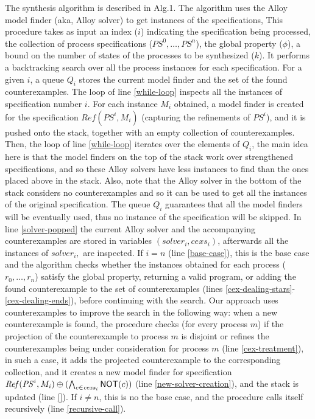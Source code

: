 	The synthesis algorithm is described in Alg.1. The algorithm uses the Alloy model finder (aka, Alloy solver) to get instances of the  specifications,  
This procedure takes as input an index ($i$) indicating the specification being processed, the collection of process specifications ($\textit{PS}^0,\dots,\textit{PS}^n$), the global property  ($\phi$), a bound on the number of states of the processes to be synthesized ($k$). It performs a backtracking search over all the process instances for each specification. For a given $i$, a queue $Q_i$ stores the current model finder and the set of the found counterexamples. The loop of line \ref{while-loop} inspects all the instances of specification number $i$. For each instance $M_i$ obtained, a model finder is created for the specification $\textit{Ref}(\textit{PS}^i, M_i)$ (capturing the refinements of $\textit{PS}^i$), and it is pushed onto the stack, together with an empty collection of
counterexamples. Then, the loop of line \ref{while-loop} iterates over the elements of $Q_i$, the main idea here is that the model finders on the top of the stack work over strengthened specifications, and so these Alloy solvers have less instances to find than the ones placed  above in the stack.  Also, note that the Alloy solver in the bottom of the stack considers no counterexamples and so it can be used to get all the instances of the original specification. The queue $Q_i$ guarantees that all the model finders will be eventually used, thus no instance of the specification will be skipped.
	In line \ref{solver-popped} the current Alloy solver and the accompanying counterexamples are stored in variables $(\textit{solver}_i, \textit{cexs}_i)$, afterwards all
	the instances of $\textit{solver}_i,$ are inspected. If $i=n$ (line \ref{base-case}), this is the base case and the algorithm checks whether the instances obtained for each process ($r_0,\dots,r_n$) satisfy the global property, returning a valid program, or adding the found counterexample to the set of counterexamples (lines \ref{cex-dealing-stars}-\ref{cex-dealing-ends}), before continuing with the search. Our approach uses counterexamples to improve the search in the following way: when a new counterexample is found, the procedure checks (for every process $m$) if the projection of the counterexample to process $m$ is disjoint or refines the counterexamples being under consideration for process $m$ (line \ref{cex-treatment}), in such a case, it adds the projected counterexample to the corresponding collection, and  it creates a new model finder for specification $\mathit{Ref}(\mathit{PS}^i,M_i)\oplus (\bigwedge_{c \in \mathit{cexs}_i} \mathsf{NOT}(c))$ (line \ref{new-solver-creation}), and the stack is updated (line \ref{}). If  $i \neq n$, this is no the base case, and the procedure calls itself recursively (line \ref{recursive-call}).




